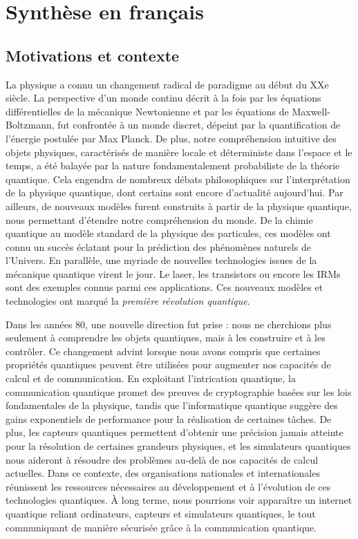 \chapter{Synthèse en français}

\section{Motivations et contexte}

La physique a connu un changement radical de paradigme au début du XXe siècle.
La perspective d'un monde continu décrit à la fois par les équations différentielles de la mécanique Newtonienne et par les équations de Maxwell-Boltzmann, fut confrontée à un monde discret, dépeint par la quantification de l'énergie postulée par Max Planck.
De plus, notre compréhension intuitive des objets physiques, caractérisés de manière locale et déterministe dans l'espace et le temps, a été ba\-layée par la nature fondamentalement probabiliste de la théorie quantique.
Cela engendra de nombreux débats philosophiques sur l'interprétation de la physique quantique, dont certains sont encore d'actualité aujourd'hui.
Par ailleurs, de nouveaux modèles furent construits à partir de la physique quantique, nous permettant d'étendre notre compréhension du monde.
De la chimie quantique au modèle standard de la physique des particules, ces modèles ont connu un succès éclatant pour la prédiction des phénomènes naturels de l'Univers.
En parallèle, une myriade de nouvelles technologies issues de la mécanique quantique virent le jour.
Le laser, les transistors ou encore les IRMs sont des exemples connus parmi ces applications.
Ces nouveaux modèles et technologies ont marqué la \textit{première révolution quantique}.

\medbreak

Dans les années 80, une nouvelle direction fut prise : nous ne cherchions plus seulement à comprendre les objets quantiques, mais à les construire et à les contrôler.
Ce changement advint lorsque nous avons compris que certaines propriétés quantiques peuvent être utilisées pour augmenter nos capacités de calcul et de communication.
En exploitant l'intrication quantique, la communication quantique promet des preuves de cryptographie basées sur les lois fondamentales de la physique, tandis que l'informatique quantique suggère des gains exponentiels de performance pour la réalisation de certaines tâches.
De plus, les capteurs quantiques permettent d'obtenir une précision jamais atteinte pour la résolution de certaines grandeurs physiques, et les simulateurs quantiques nous aideront à résoudre des problèmes au-delà de nos capacités de calcul actuelles.
Dans ce contexte, des organisations nationales et internationales réunissent les ressources nécessaires au développement et à l'évolution de ces technologies quantiques.
À long terme, nous pourrions voir apparaître un internet quantique reliant ordinateurs, capteurs et simulateurs quantiques, le tout communiquant de manière sécurisée grâce à la communication quantique.

